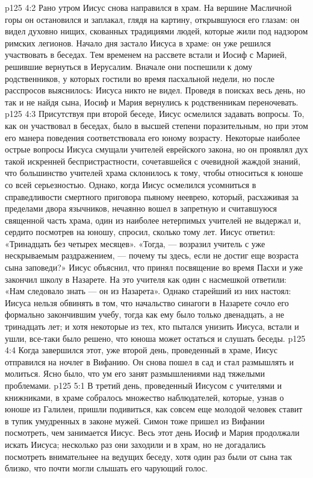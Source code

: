 \vs p125 4:2 Рано утром Иисус снова направился в храм. На вершине Масличной горы он остановился и заплакал, глядя на картину, открывшуюся его глазам: он видел духовно нищих, скованных традициями людей, которые жили под надзором римских легионов. Начало дня застало Иисуса в храме: он уже решился участвовать в беседах. Тем временем на рассвете встали и Иосиф с Марией, решившие вернуться в Иерусалим. Вначале они поспешили к дому родственников, у которых гостили во время пасхальной недели, но после расспросов выяснилось: Иисуса никто не видел. Проведя в поисках весь день, но так и не найдя сына, Иосиф и Мария вернулись к родственникам переночевать.
\vs p125 4:3 Присутствуя при второй беседе, Иисус осмелился задавать вопросы. То, как он участвовал в беседах, было в высшей степени поразительным, но при этом его манера поведения соответствовала его юному возрасту. Некоторые наиболее острые вопросы Иисуса смущали учителей еврейского закона, но он проявлял дух такой искренней беспристрастности, сочетавшейся с очевидной жаждой знаний, что большинство учителей храма склонилось к тому, чтобы относиться к юноше со всей серьезностью. Однако, когда Иисус осмелился усомниться в справедливости смертного приговора пьяному нееврею, который, расхаживая за пределами двора язычников, нечаянно вошел в запретную и считавшуюся священной часть храма, один из наиболее нетерпимых учителей не выдержал и, сердито посмотрев на юношу, спросил, сколько тому лет. Иисус ответил: «Тринадцать без четырех месяцев». «Тогда, --- возразил учитель с уже нескрываемым раздражением, --- почему ты здесь, если не достиг еще возраста сына заповеди?» Иисус объяснил, что принял посвящение во время Пасхи и уже закончил школу в Назарете. На это учителя как один с насмешкой ответили: «Нам следовало знать --- он из Назарета». Однако старейший из них настоял: Иисуса нельзя обвинять в том, что начальство синагоги в Назарете сочло его формально закончившим учебу, тогда как ему было только двенадцать, а не тринадцать лет; и хотя некоторые из тех, кто пытался унизить Иисуса, встали и ушли, все\hyp{}таки было решено, что юноша может остаться и слушать беседы.
\vs p125 4:4 Когда завершился этот, уже второй день, проведенный в храме, Иисус отправился на ночлег в Вифанию. Он снова пошел в сад и стал размышлять и молиться. Ясно было, что ум его занят размышлениями над тяжелыми проблемами.
\vs p125 5:1 В третий день, проведенный Иисусом с учителями и книжниками, в храме собралось множество наблюдателей, которые, узнав о юноше из Галилеи, пришли подивиться, как совсем еще молодой человек ставит в тупик умудренных в законе мужей. Симон тоже пришел из Вифании посмотреть, чем занимается Иисус. Весь этот день Иосиф и Мария продолжали искать Иисуса; несколько раз они заходили и в храм, но не догадались посмотреть внимательнее на ведущих беседу, хотя один раз были от сына так близко, что почти могли слышать его чарующий голос.
